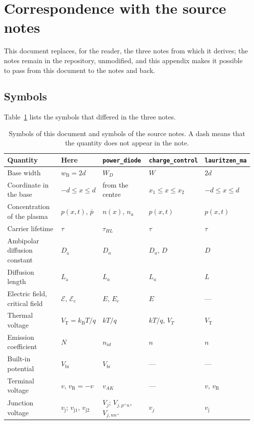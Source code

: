\documentclass[10pt,a4paper]{scrartcl}
\newcommand{\vj}{v_\mathrm{j}}
\newcommand{\vjo}{v_\mathrm{j1}}
\newcommand{\vjt}{v_\mathrm{j2}}
\newcommand{\VT}{V_\mathrm{T}}
\newcommand{\Nem}{N}                          %
\newcommand{\Ef}{\mathcal{E}}                 %
\newcommand{\Ec}{\mathcal{E}_\mathrm{c}}      %
\newcommand{\wB}{w_\mathrm{B}}
\newcommand{\Da}{D_\mathrm{a}}
\newcommand{\La}{L_\mathrm{a}}
\newcommand{\Vbi}{V_\mathrm{bi}}
\newcommand{\kB}{k_\mathrm{B}}
\begin{document}
%
\section{Correspondence with the source notes}
\label{app:origin}
This document replaces, for the reader, the three notes from which it derives; the notes remain in the repository, unmodified, and this appendix makes it possible to pass from this document to the notes and back.

\subsection{Symbols}
Table~\ref{tab:origin} lists the symbols that differed in the three notes.

\begin{table}[htb]
\centering\small
\caption{Symbols of this document and symbols of the source notes. A dash means that the quantity does not appear in the note.}
\label{tab:origin}
\begin{tabular}{@{}>{\raggedright\arraybackslash}p{4.3cm}llll@{}}
\toprule
Quantity & Here & \texttt{power\_diode} & \texttt{charge\_control} & \texttt{lauritzen\_ma} \\
\midrule
Base width & $\wB = 2d$ & $W_D$ & $W$ & $2d$ \\
Coordinate in the base & $-d \leq x \leq d$ & from the centre & $x_1 \leq x \leq x_2$ & $-d \leq x \leq d$ \\
Concentration of the plasma & $p(x,t)$, $\bar p$ & $n(x)$, $n_a$ & $p(x,t)$ & $p(x,t)$ \\
Carrier lifetime & $\tau$ & $\tau_{HL}$ & $\tau$ & $\tau$ \\
Ambipolar diffusion constant & $\Da$ & $D_a$ & $D_a$, $D$ & $D$ \\
Diffusion length & $\La$ & $L_a$ & $L_a$ & $L$ \\
Electric field, critical field & $\Ef$, $\Ec$ & $E$, $E_c$ & $E$ & --- \\
Thermal voltage & $\VT = \kB T/q$ & $kT/q$ & $kT/q$, $V_T$ & $\VT$ \\
Emission coefficient & $\Nem$ & $n_{id}$ & $n$ & $n$ \\
Built-in potential & $\Vbi$ & $V_{bi}$ & --- & --- \\
Terminal voltage & $v$, $v_\mathrm{R} = -v$ & $v_{AK}$ & --- & $v$, $v_\mathrm{R}$ \\ Junction voltage & $\vj$; $\vjo$, $\vjt$ & $V_j$; $V_{j,p^+n}$, $V_{j,nn^+}$ & $v_j$ & $\vj$ \\

\end{tabular}
\end{table}
\end{document}
